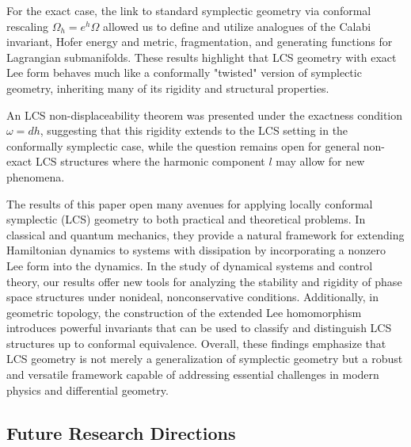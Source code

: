 \documentclass[11pt,a4paper]{amsart}
\theoremstyle{definition}
\theoremstyle{remark}
\begin{document}
	For the exact case, the link to standard symplectic geometry via conformal rescaling $\Omega_h = e^h\Omega$ allowed us to define and utilize analogues of the Calabi invariant, Hofer energy and metric, fragmentation, and generating functions for Lagrangian submanifolds. These results highlight that LCS geometry with exact Lee form behaves much like a conformally "twisted" version of symplectic geometry, inheriting many of its rigidity and structural properties.
	
	An LCS non-displaceability theorem was presented under the exactness condition $\omega = dh$, suggesting that this rigidity extends to the LCS setting in the conformally symplectic case, while the question remains open for general non-exact LCS structures where the harmonic component $l$ may allow for new phenomena.
	
	The results of this paper open many avenues for applying locally conformal symplectic (LCS) geometry to both practical and theoretical problems. In classical and quantum mechanics, they provide a natural framework for extending Hamiltonian dynamics to systems with dissipation by incorporating a nonzero Lee form into the dynamics. In the study of dynamical systems and control theory, our results offer new tools for analyzing the stability and rigidity of phase space structures under nonideal, nonconservative conditions. Additionally, in geometric topology, the construction of the extended Lee homomorphism introduces powerful invariants that can be used to classify and distinguish LCS structures up to conformal equivalence. Overall, these findings emphasize that LCS geometry is not merely a generalization of symplectic geometry but a robust and versatile framework capable of addressing essential challenges in modern physics and differential geometry.
	
	\subsection*{Future Research Directions}
	
\end{document}
